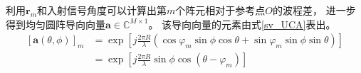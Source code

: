 \documentclass[master]{thesis-uestc}
\begin{document}
利用$\bm{r}_m$和入射信号角度可以计算出第$m$个阵元相对于参考点$O$的波程差，
进一步得到均匀圆阵导向向量$\bm{a}\in\mathbb{C}^{M\times1}$。
该导向向量的元素由式\eqref{sv_UCA}表出。
\begin{equation}\label{sv_UCA}
    \begin{aligned}
        \left[\bm{a}(\theta,\phi)\right]_m 
        &= 
        \exp\left[j\frac{2 \pi R}{\lambda}
                  \left(
                  \cos\varphi_m\sin\phi\cos\theta + 
                  \sin\varphi_m\sin\phi\sin\theta
                  \right)
            \right]
            \\
        &=    
            \exp\left[
            j\frac{2\pi R}{\lambda}\sin\phi
            \cos\left(\theta-\varphi_m\right)
            \right]
    \end{aligned}
\end{equation}
\end{document}
